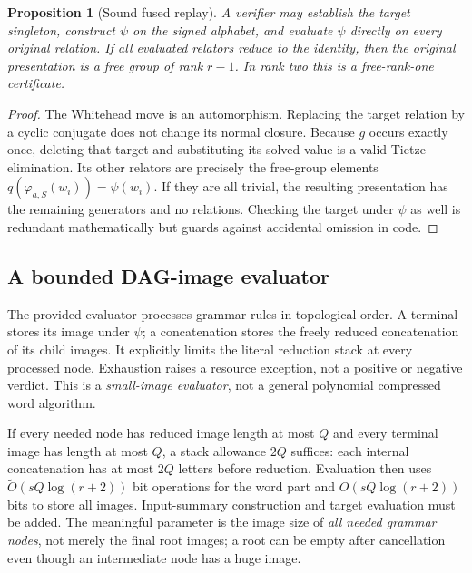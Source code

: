 \documentclass[11pt,letterpaper]{article}
\newtheorem{proposition}[theorem]{Proposition}
\theoremstyle{definition}\newtheorem{definition}[theorem]{Definition}
\newcommand{\wh}{\varphi_{a,S}}
\begin{document}
\begin{proposition}[Sound fused replay]\label{prop:fused}
A verifier may establish the target singleton, construct $\psi$ on the signed alphabet, and evaluate $\psi$ directly on every original relation. If all evaluated relators reduce to the identity, then the original presentation is a free group of rank $r-1$. In rank two this is a free-rank-one certificate.
\end{proposition}
\begin{proof}
The Whitehead move is an automorphism. Replacing the target relation by a cyclic conjugate does not change its normal closure. Because $g$ occurs exactly once, deleting that target and substituting its solved value is a valid Tietze elimination. Its other relators are precisely the free-group elements $q(\wh(w_i))=\psi(w_i)$. If they are all trivial, the resulting presentation has the remaining generators and no relations. Checking the target under $\psi$ as well is redundant mathematically but guards against accidental omission in code.
\end{proof}

\subsection{A bounded DAG-image evaluator}
The provided evaluator processes grammar rules in topological order. A terminal stores its image under $\psi$; a concatenation stores the freely reduced concatenation of its child images. It explicitly limits the literal reduction stack at every processed node. Exhaustion raises a resource exception, not a positive or negative verdict. This is a \emph{small-image evaluator}, not a general polynomial compressed word algorithm.

If every needed node has reduced image length at most $Q$ and every terminal image has length at most $Q$, a stack allowance $2Q$ suffices: each internal concatenation has at most $2Q$ letters before reduction. Evaluation then uses $\widetilde O(sQ\log(r+2))$ bit operations for the word part and $O(sQ\log(r+2))$ bits to store all images. Input-summary construction and target evaluation must be added. The meaningful parameter is the image size of \emph{all needed grammar nodes}, not merely the final root images; a root can be empty after cancellation even though an intermediate node has a huge image.
\end{document}
